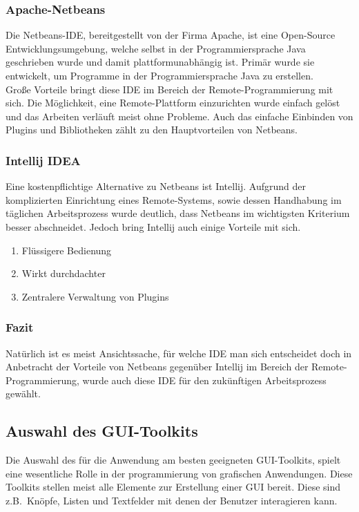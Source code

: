 \subsubsection{Apache-Netbeans}
Die Netbeans-IDE, bereitgestellt von der Firma Apache, ist eine Open-Source Entwicklungsumgebung, welche selbst in der Programmiersprache Java geschrieben wurde und damit plattformunabhängig ist.
Primär wurde sie entwickelt, um Programme in der Programmiersprache Java zu erstellen.\\
Große Vorteile bringt diese IDE im Bereich der Remote-Programmierung mit sich.
Die Möglichkeit, eine Remote-Plattform einzurichten wurde einfach gelöst und das Arbeiten verläuft meist ohne Probleme.
Auch das einfache Einbinden von Plugins und Bibliotheken zählt zu den Hauptvorteilen von Netbeans.
\subsubsection{Intellij IDEA}
Eine kostenpflichtige Alternative zu Netbeans ist Intellij.
Aufgrund der komplizierten Einrichtung eines Remote-Systems, sowie dessen Handhabung im täglichen Arbeitsprozess wurde deutlich, dass Netbeans im wichtigsten Kriterium besser abschneidet.
Jedoch bring Intellij auch einige Vorteile mit sich.
\begin{enumerate}
    \item Flüssigere Bedienung
    \item Wirkt durchdachter
    \item Zentralere Verwaltung von Plugins
\end{enumerate}
\subsubsection{Fazit}
Natürlich ist es meist Ansichtssache, für welche IDE man sich entscheidet doch in Anbetracht der Vorteile von Netbeans gegenüber Intellij im Bereich der Remote-Programmierung, wurde auch diese IDE für den zukünftigen Arbeitsprozess gewählt.
\subsection{Auswahl des GUI-Toolkits}\label{subsec:auswahl-des-gui-toolkits}
Die Auswahl des für die Anwendung am besten geeigneten GUI-Toolkits, spielt eine wesentliche Rolle in der programmierung von grafischen Anwendungen.
Diese Toolkits stellen meist alle Elemente zur Erstellung einer GUI bereit.
Diese sind z.B.\ Knöpfe, Listen und Textfelder mit denen der Benutzer interagieren kann.
